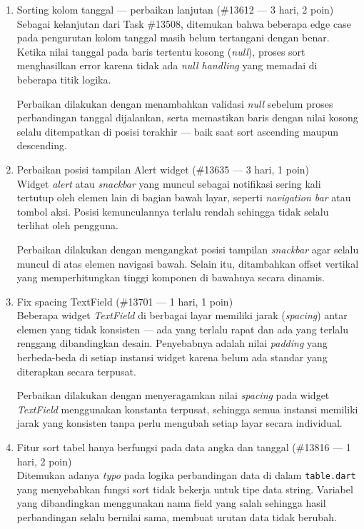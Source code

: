 \begin{enumerate}
    \item Sorting kolom tanggal --- perbaikan lanjutan (\#13612 --- 3 hari, 2 poin) \\
          Sebagai kelanjutan dari Task \#13508, ditemukan bahwa beberapa edge case pada
          pengurutan kolom tanggal masih belum tertangani dengan benar. Ketika nilai
          tanggal pada baris tertentu kosong (\textit{null}), proses sort menghasilkan
          error karena tidak ada \textit{null handling} yang memadai di beberapa titik
          logika.

          Perbaikan dilakukan dengan menambahkan validasi \textit{null} sebelum proses
          perbandingan tanggal dijalankan, serta memastikan baris dengan nilai kosong
          selalu ditempatkan di posisi terakhir --- baik saat sort ascending maupun
          descending.

    \item Perbaikan posisi tampilan Alert widget (\#13635 --- 3 hari, 1 poin) \\ Widget
          \textit{alert} atau \textit{snackbar} yang muncul sebagai notifikasi sering
          kali tertutup oleh elemen lain di bagian bawah layar, seperti
          \textit{navigation bar} atau tombol aksi. Posisi kemunculannya terlalu rendah
          sehingga tidak selalu terlihat oleh pengguna.

          Perbaikan dilakukan dengan mengangkat posisi tampilan \textit{snackbar} agar
          selalu muncul di atas elemen navigasi bawah. Selain itu, ditambahkan offset
          vertikal yang memperhitungkan tinggi komponen di bawahnya secara dinamis.

    \item Fix spacing TextField (\#13701 --- 1 hari, 1 poin) \\ Beberapa widget
          \textit{TextField} di berbagai layar memiliki jarak (\textit{spacing}) antar
          elemen yang tidak konsisten --- ada yang terlalu rapat dan ada yang terlalu
          renggang dibandingkan desain. Penyebabnya adalah nilai \textit{padding} yang
          berbeda-beda di setiap instansi widget karena belum ada standar yang diterapkan
          secara terpusat.

          Perbaikan dilakukan dengan menyeragamkan nilai \textit{spacing} pada widget
          \textit{TextField} menggunakan konstanta terpusat, sehingga semua instansi
          memiliki jarak yang konsisten tanpa perlu mengubah setiap layar secara
          individual.

    \item Fitur sort tabel hanya berfungsi pada data angka dan tanggal (\#13816 --- 1
          hari, 2 poin) \\ Ditemukan adanya \textit{typo} pada logika perbandingan data
          di dalam \texttt{table.dart} yang menyebabkan fungsi sort tidak bekerja untuk
          tipe data string. Variabel yang dibandingkan menggunakan nama field yang salah
          sehingga hasil perbandingan selalu bernilai sama, membuat urutan data tidak
          berubah.


\end{enumerate}
